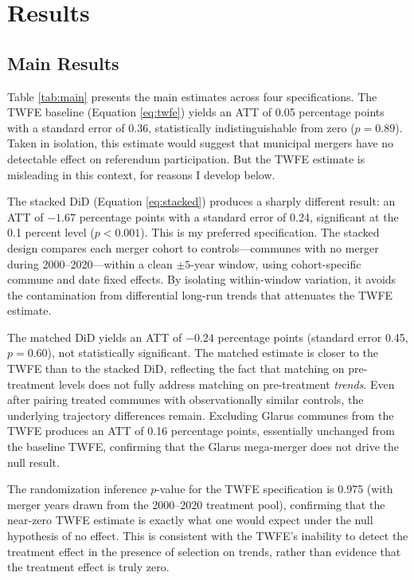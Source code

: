 \documentclass[12pt]{article}
\begin{document}
\section{Results}

\subsection{Main Results}



Table \ref{tab:main} presents the main estimates across four specifications. The TWFE baseline (Equation \ref{eq:twfe}) yields an ATT of 0.05 percentage points with a standard error of 0.36, statistically indistinguishable from zero ($p = 0.89$). Taken in isolation, this estimate would suggest that municipal mergers have no detectable effect on referendum participation. But the TWFE estimate is misleading in this context, for reasons I develop below.

The stacked DiD (Equation \ref{eq:stacked}) produces a sharply different result: an ATT of $-1.67$ percentage points with a standard error of 0.24, significant at the 0.1 percent level ($p < 0.001$). This is my preferred specification. The stacked design compares each merger cohort to controls---communes with no merger during 2000--2020---within a clean $\pm 5$-year window, using cohort-specific commune and date fixed effects. By isolating within-window variation, it avoids the contamination from differential long-run trends that attenuates the TWFE estimate.

The matched DiD yields an ATT of $-0.24$ percentage points (standard error 0.45, $p = 0.60$), not statistically significant. The matched estimate is closer to the TWFE than to the stacked DiD, reflecting the fact that matching on pre-treatment levels does not fully address matching on pre-treatment \textit{trends}. Even after pairing treated communes with observationally similar controls, the underlying trajectory differences remain. Excluding Glarus communes from the TWFE produces an ATT of 0.16 percentage points, essentially unchanged from the baseline TWFE, confirming that the Glarus mega-merger does not drive the null result.

The randomization inference $p$-value for the TWFE specification is 0.975 (with merger years drawn from the 2000--2020 treatment pool), confirming that the near-zero TWFE estimate is exactly what one would expect under the null hypothesis of no effect. This is consistent with the TWFE's inability to detect the treatment effect in the presence of selection on trends, rather than evidence that the treatment effect is truly zero.
\end{document}
